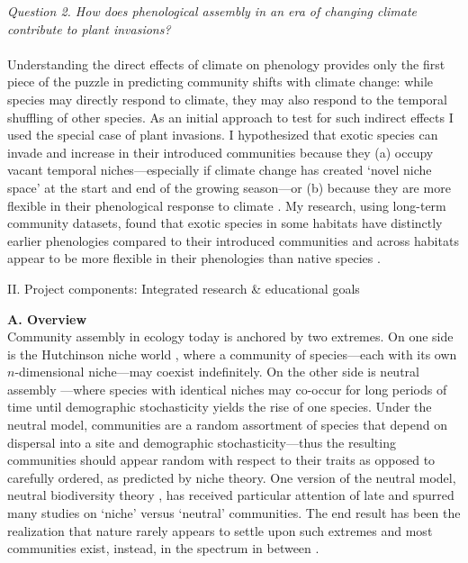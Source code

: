\documentclass[12pt,a4paper,oneside]{article}
\begin{document}
\vspace{-1ex}
\noindent \emph{Question 2. How does phenological assembly in an era of changing climate contribute to plant invasions?}\\
\vspace{-1ex}\\
\noindent Understanding the direct effects of climate on phenology provides only the first piece of the puzzle in predicting community shifts with climate change: while species may directly respond to climate, they may also respond to the temporal shuffling of other species. As an initial approach to test for such indirect effects I used the special case of plant invasions. I hypothesized that exotic species can invade and increase in their introduced communities because they (a) occupy vacant temporal niches---especially if climate change has created `novel niche space' at the start and end of the growing season---or (b) because they are more flexible in their phenological response to climate \citep{wolkovich:2010fee}. My research, using long-term community datasets, found that exotic species in some habitats have distinctly earlier phenologies compared to their introduced communities and across habitats appear to be more flexible in their phenologies than native species \citep{wolkovich2014aob}. \\
\begin{center}
{\sc II. Project components: Integrated research \& educational goals}
\vspace{0.5ex}\\
\end{center}
{\bf A. Overview}
\vspace{0.5ex}\\
Community assembly in ecology today is anchored by two extremes. On one side is the Hutchinson niche world \citep{Hutchinson:1959xi}, where a community of species---each with its own $n$-dimensional niche---may coexist indefinitely. On the other side is neutral assembly \citep{Watterson:1974gk,Caswell:1976np}---where species with identical niches may co-occur for long periods of time until demographic stochasticity yields the rise of one species. Under the neutral model, communities are a random assortment of species that depend on dispersal into a site and demographic stochasticity---thus the resulting communities should appear random with respect to their traits as opposed to carefully ordered, as predicted by niche theory. One version of the neutral model, neutral biodiversity theory \citep{Hubbell:2001vo}, has received particular attention of late \citep[note that I use the term `neutral' and `random' to refer to any model where species' traits do not impact long-term co-occurrence, \emph{sensu}][]{Kraft:2008oz} and spurred many studies on `niche' versus `neutral' communities. The end result has been the realization that nature rarely appears to settle upon such extremes and most communities exist, instead, in the spectrum in between \citep{Chase:2007yt,Vergnon:2009bh}. %
\end{document}
